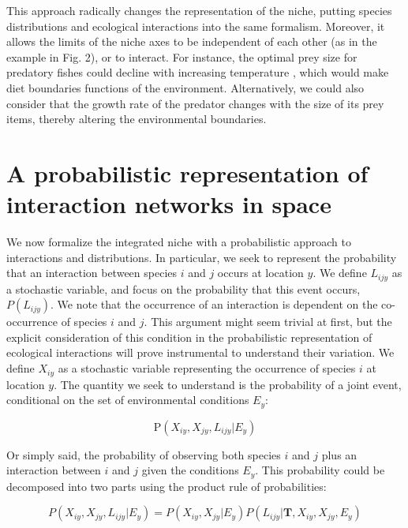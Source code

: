 \documentclass[12pt]{article}
\begin{document}
This approach radically changes the representation of the niche, putting species
distributions and ecological interactions into the same formalism.
Moreover, it allows the limits of the niche axes to be independent of each other (as in the
example in Fig. 2), or to interact. For instance, the optimal
prey size for predatory fishes could decline with increasing temperature
\citep{Lelong2015}, which would make diet boundaries functions of the
environment. Alternatively, we could also consider that the growth rate
of the predator changes with the size of its prey items, thereby altering the
environmental boundaries.

\section*{A probabilistic representation of interaction networks in space}

We now formalize the integrated niche with a probabilistic approach to
interactions and distributions. In particular, we seek to represent the probability that an
interaction between species $i$ and $j$ occurs at location $y$. We define
$L_{ijy}$ as a stochastic variable, and focus on the probability that
this event occurs, $P(L_{ijy})$. We note that the occurrence of an interaction is dependent
on the co-occurrence of species $i$ and $j$. This argument might seem trivial
at first, but the explicit consideration of this condition in the
probabilistic representation of ecological interactions will prove instrumental
to understand their variation. We define $X_{iy}$ as a stochastic variable
representing the occurrence of species $i$ at location $y$. The quantity we seek to
understand is the probability of a joint event, conditional on the set of
environmental conditions $E_y$:

\begin{equation}
	\text{P}(X_{iy},X_{jy},L_{ijy}|E_y)
\end{equation}

Or simply said, the probability of observing both species $i$ and $j$ plus an
interaction between $i$ and $j$ given the conditions $E_y$. This probability
could be decomposed into two parts using the product rule of probabilities:

\begin{equation}
	P(X_{iy},X_{jy},L_{ijy}|E_y)=P(X_{iy},X_{jy}|E_y)P(L_{ijy}|\mathbf{T},X_{iy},X_{jy},E_y)
\end{equation}
\end{document}
